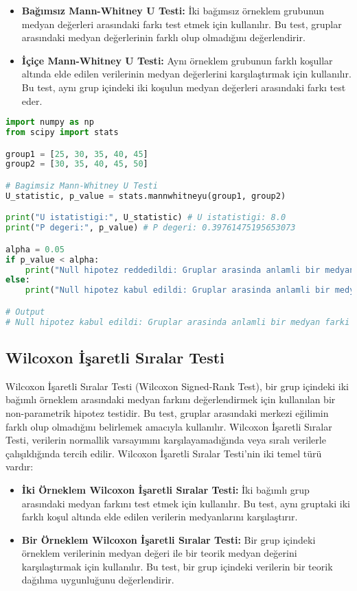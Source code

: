 \begin{itemize}
    \item \textbf{Bağımsız Mann-Whitney U Testi:} İki bağımsız örneklem grubunun medyan değerleri arasındaki farkı test etmek için kullanılır. Bu test, gruplar arasındaki medyan değerlerinin farklı olup olmadığını değerlendirir.
    \item \textbf{İçiçe Mann-Whitney U Testi:} Aynı örneklem grubunun farklı koşullar altında elde edilen verilerinin medyan değerlerini karşılaştırmak için kullanılır. Bu test, aynı grup içindeki iki koşulun medyan değerleri arasındaki farkı test eder.
\end{itemize}

\begin{lstlisting}[language=Python]
import numpy as np
from scipy import stats

group1 = [25, 30, 35, 40, 45]
group2 = [30, 35, 40, 45, 50]

# Bagimsiz Mann-Whitney U Testi
U_statistic, p_value = stats.mannwhitneyu(group1, group2)

print("U istatistigi:", U_statistic) # U istatistigi: 8.0
print("P degeri:", p_value) # P degeri: 0.39761475195653073

alpha = 0.05
if p_value < alpha:
    print("Null hipotez reddedildi: Gruplar arasinda anlamli bir medyan farki vardir.")
else:
    print("Null hipotez kabul edildi: Gruplar arasinda anlamli bir medyan farki yoktur.")

# Output
# Null hipotez kabul edildi: Gruplar arasinda anlamli bir medyan farki yoktur.
\end{lstlisting}

\newpage

\subsection{Wilcoxon İşaretli Sıralar Testi}
Wilcoxon İşaretli Sıralar Testi (Wilcoxon Signed-Rank Test), bir grup içindeki iki bağımlı örneklem arasındaki medyan farkını değerlendirmek için kullanılan bir non-parametrik hipotez testidir. Bu test, gruplar arasındaki merkezi eğilimin farklı olup olmadığını belirlemek amacıyla kullanılır. Wilcoxon İşaretli Sıralar Testi, verilerin normallik varsayımını karşılayamadığında veya sıralı verilerle çalışıldığında tercih edilir. Wilcoxon İşaretli Sıralar Testi'nin iki temel türü vardır:

\begin{itemize}
    \item \textbf{İki Örneklem Wilcoxon İşaretli Sıralar Testi:} İki bağımlı grup arasındaki medyan farkını test etmek için kullanılır. Bu test, aynı gruptaki iki farklı koşul altında elde edilen verilerin medyanlarını karşılaştırır.
    \item \textbf{Bir Örneklem Wilcoxon İşaretli Sıralar Testi:} Bir grup içindeki örneklem verilerinin medyan değeri ile bir teorik medyan değerini karşılaştırmak için kullanılır. Bu test, bir grup içindeki verilerin bir teorik dağılıma uygunluğunu değerlendirir.
\end{itemize}

